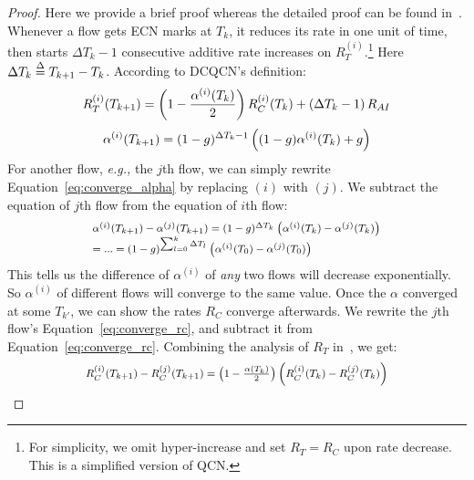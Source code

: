 \begin{proof}
Here we provide a brief proof whereas the detailed proof can be found in~\cite{fullpaper}.
Whenever a flow gets ECN marks at $T_k$, it reduces its
rate in one unit of time, then starts $\Delta {T_k} -1 $ consecutive additive rate
increases on $R_T^{(i)}$.\footnote{For simplicity, we omit hyper-increase and set 
$R_T = R_C$ upon rate decrease. This is a simplified version of QCN.}
Here $\Delta {T_k} \buildrel \Delta \over = {T_{k + 1}} - {T_k}$. According to DCQCN's definition:
\begin{equation}
\small
R_T^{(i)}({T_{k + 1}}) = \left( {1 - \frac{{{\alpha ^{(i)}}({T_k})}}{2}} \right)R_C^{(i)}({T_k}) + \left( {\Delta {T_k} - 1} \right){R_{AI}}
\label{eq:converge_rc}
\end{equation}
\begin{equation}
\small
{\alpha ^{(i)}}({T_{k + 1}}) = {(1 - g)^{\Delta {T_k} - 1}}\left( {(1 - g){\alpha ^{(i)}}({T_k}) + g} \right)
\label{eq:converge_alpha}
\end{equation}
For another flow, {\em e.g.,} the $j$th flow, we can simply rewrite Equation~\ref{eq:converge_alpha} by 
replacing $(i)$ with $(j)$. We subtract the equation of $j$th flow from the equation of $i$th flow:
\begin{equation}
\small
\begin{array}{l}
{\alpha ^{(i)}}({T_{k + 1}}) - {\alpha ^{(j)}}({T_{k + 1}}) = {(1 - g)^{\Delta {T_k}}}\left( {{\alpha ^{(i)}}({T_k}) - {\alpha ^{(j)}}({T_k})} \right)\\
 = ... = {(1 - g)^{\sum\nolimits_{l = 0}^k {\Delta {T_l}} }}\left( {{\alpha ^{(i)}}({T_0}) - {\alpha ^{(j)}}({T_0})} \right)
\end{array}
\label{eq:converge_alphaarray}
\end{equation}
This tells us the difference of $\alpha^{(i)}$ of {\em any} two flows will decrease exponentially. So $\alpha^{(i)}$
of different flows will converge to the same value. Once the $\alpha$ converged at some $T_{k'}$, we can show 
the rates $R_C$ converge afterwards. We rewrite the $j$th flow's Equation~\ref{eq:converge_rc}, and subtract it 
from Equation~\ref{eq:converge_rc}. Combining the analysis of $R_T$ in~\cite{fullpaper}, we get:
\begin{equation}
\small
\begin{array}{l}
R_C^{(i)}({T_{k + 1}}) - R_C^{(j)}({T_{k + 1}}) = \left( {1 - \frac{{\alpha ({T_k})}}{2}} \right)\left( {R_C^{(i)}({T_k}) - R_C^{(j)}({T_k})} \right)\\

\end{array}
\end{equation}
\end{proof}
